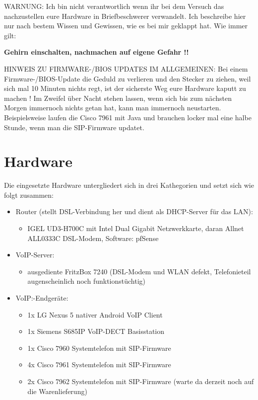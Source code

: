 \documentclass[a4paper,12pt]{scrbook}
\begin{document}
WARNUNG: Ich bin nicht verantwortlich wenn ihr bei dem Versuch das nachzustellen eure Hardware in Briefbeschwerer verwandelt. Ich
beschreibe hier nur nach bestem Wissen und Gewissen, wie es bei mir geklappt hat. Wie immer gilt: 


\textbf{Gehirn einschalten, nachmachen auf eigene Gefahr !!}


HINWEIS ZU FIRMWARE-/BIOS UPDATES IM ALLGEMEINEN: Bei einem Firmware-/BIOS-Update die Geduld zu verlieren und den Stecker zu ziehen,
weil sich mal 10 Minuten nichts regt, ist der sicherste Weg eure Hardware kaputt zu machen ! Im Zweifel über Nacht stehen lassen, wenn
sich bis zum nächsten Morgen immernoch nichts getan hat, kann man immernoch neustarten. Beispielsweise laufen die Cisco 7961 mit Java und
brauchen locker mal eine halbe Stunde, wenn man die SIP-Firmware updatet. 

\chapter{Hardware}
\label{sec:1}

Die eingesetzte Hardware untergliedert sich in drei Kathegorien und setzt sich wie folgt zusammen:

\begin{itemize}
 \item Router (stellt DSL-Verbindung her und dient als DHCP-Server für das LAN):
 \begin{itemize}
  \item IGEL UD3-H700C mit Intel Dual Gigabit Netzwerkkarte, daran Allnet ALL0333C DSL-Modem, Software: pfSense
 \end{itemize}
 \item VoIP-Server: 
 \begin{itemize}
  \item ausgediente FritzBox 7240 (DSL-Modem und WLAN defekt, Telefonieteil augenscheinlich noch funktionstüchtig)
 \end{itemize}
 \item VoIP:-Endgeräte:
 \begin{itemize}
  \item 1x LG Nexus 5 nativer Android VoIP Client
  \item 1x Siemens S685IP VoIP-DECT Basisstation
  \item 1x Cisco 7960 Systemtelefon mit SIP-Firmware
  \item 4x Cisco 7961 Systemtelefon mit SIP-Firmware
  \item 2x Cisco 7962 Systemtelefon mit SIP-Firmware (warte da derzeit noch auf die Warenlieferung)
 \end{itemize}
\end{itemize}
\end{document}
